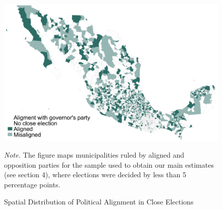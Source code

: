 \documentclass[dv_diss_main.tex]{subfiles}
\begin{document}
\begin{figure}[h]
    \begin{center}
			\includegraphics[width=0.8\linewidth]{figures/map00s_v2.png}
			\caption{Spatial Distribution of Political Alignment in Close Elections}\label{fig:map}
    \end{center}
	\vspace{0.5em}
	\begin{figurenotes}
    \footnotesize	
	\textit{Note. }The figure maps municipalities ruled by aligned and opposition parties for the sample used to obtain our main estimates (see section 4), where elections were decided by less than 5 percentage points.
	\end{figurenotes}
\end{figure}

\newpage
\end{document}
